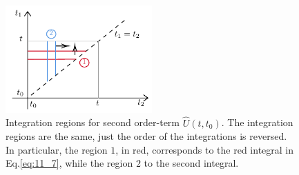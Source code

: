\documentclass[../main/main.tex]{subfiles}
\begin{document}
\begin{figure}[h!]
\centering
\includegraphics[width=0.5\textwidth]{../lessons/11_image/1.pdf}
\caption{\label{fig:11_1} Integration regions for second order-term \( \hat{U} (t,t_0)  \). The integration regions are the same, just the order of the integrations is reversed. In particular, the region \( 1 \), in red, corresponds to the red integral in Eq.\eqref{eq:11_7}, while the region \( 2 \) to the second integral.}
\end{figure}
\end{document}
